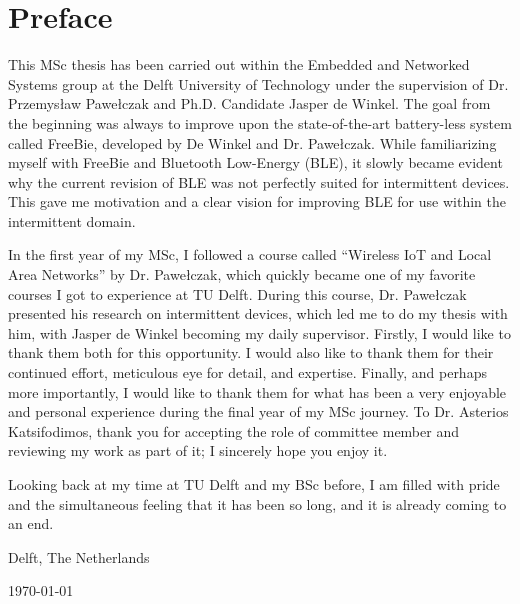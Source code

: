 \chapter*{Preface}

This MSc thesis has been carried out within the Embedded and Networked Systems group at the Delft University of Technology under the supervision of Dr. Przemysław Pawełczak and Ph.D. Candidate Jasper de Winkel. The goal from the beginning was always to improve upon the state-of-the-art battery-less system called FreeBie, developed by De Winkel and Dr. Pawełczak. While familiarizing myself with FreeBie and Bluetooth Low-Energy (BLE), it slowly became evident why the current revision of BLE was not perfectly suited for intermittent devices. This gave me motivation and a clear vision for improving BLE for use within the intermittent domain. 

\vspace{1\baselineskip}

In the first year of my MSc, I followed a course called ``Wireless IoT and Local Area Networks'' by Dr. Pawełczak, which quickly became one of my favorite courses I got to experience at TU Delft. During this course, Dr. Pawełczak presented his research on intermittent devices, which led me to do my thesis with him, with Jasper de Winkel becoming my daily supervisor. Firstly, I would like to thank them both for this opportunity. I would also like to thank them for their continued effort, meticulous eye for detail, and expertise. Finally, and perhaps more importantly, I would like to thank them for what has been a very enjoyable and personal experience during the final year of my MSc journey. To Dr. Asterios Katsifodimos, thank you for accepting the role of committee member and reviewing my work as part of it; I sincerely hope you enjoy it.

Looking back at my time at TU Delft and my BSc before, I am filled with pride and the simultaneous feeling that it has been so long, and it is already coming to an end.

\vspace{1\baselineskip}

\reportAuthor

\vspace{1\baselineskip}

\noindent
Delft, The Netherlands

\noindent
\today